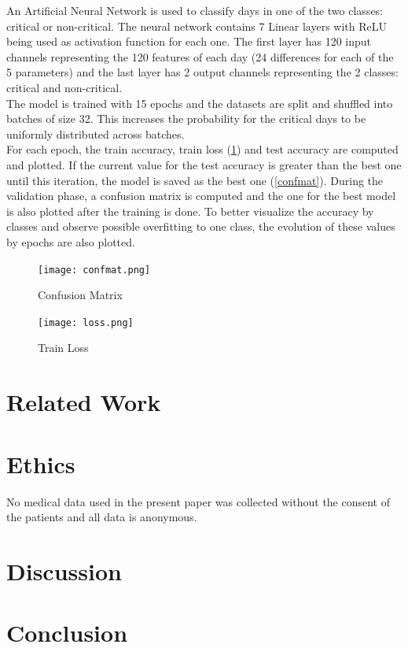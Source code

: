 \documentclass{article}
\begin{document}
An Artificial Neural Network is used to classify days in one of the two classes: critical or non-critical. The neural network contains 7 Linear layers with ReLU being used as activation function for each one. The first layer has 120 input channels representing the 120 features of each day (24 differences for each of the 5 parameters) and the last layer has 2 output channels representing the 2 classes: critical and non-critical.
\\

The model is trained with 15 epochs and the datasets are split and shuffled into batches of size 32. This increases the probability for the critical days to be uniformly distributed across batches. 
\\

For each epoch, the train accuracy, train loss (\ref{loss}) and test accuracy are computed and plotted. If the current value for the test accuracy is greater than the best one until this iteration, the model is saved as the best one (\ref{confmat}). During the validation phase, a confusion matrix is computed and the one for the best model is also plotted after the training is done. To better visualize the accuracy by classes and observe possible overfitting to one class, the evolution of these values by epochs are also plotted.


\begin{figure}[h!] 
\begin{multicols}{2}

\centering
\texttt{[image: confmat.png]}
\caption{Confusion Matrix} 
\label{confmat}

\centering
\texttt{[image: loss.png]}
\caption{Train Loss} 
\label{loss}
\end{multicols}
\end{figure}

\section{Related Work}



\newpage
\section{Ethics}

No medical data used in the present paper was collected without the consent of the patients and all data is anonymous.

\section{Discussion}
\section{Conclusion}
\newpage

\nocite{*}
\medskip
\begin{multicols}{2}
\printbibliography[heading=bibintoc]
\end{multicols}
\end{document}
